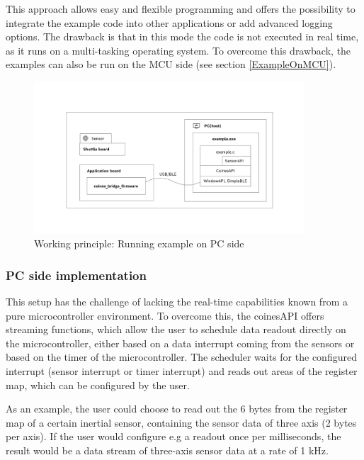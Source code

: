\documentclass{article}
\begin{document}
This approach allows easy and flexible programming and offers the possibility to integrate the example code into other applications or add advanced logging options. The drawback is that in this mode the code is not executed in real time, as it runs on a multi-tasking operating system. To overcome this drawback, the examples can also be run on the MCU side (see section \ref{ExampleOnMCU}).

\begin{figure}[H]
	\begin{center}
		\includegraphics[width=0.9\textwidth]{coinesAPI_images/COINES_workingPrinciple_runOnPC.png}
		\caption{Working principle: Running example on PC side}
	\end{center}
\end{figure}

\subsubsection{PC side implementation}
This setup has the challenge of lacking the real-time capabilities known from a pure microcontroller environment. To overcome this, the coinesAPI offers streaming functions, which allow the user to schedule data readout directly on the microcontroller, either based on a data interrupt coming from the sensors or based on the timer of the microcontroller. The scheduler waits for the configured interrupt (sensor interrupt or timer interrupt) and reads out areas of the register map, which can be configured by the user.

As an example, the user could choose to read out the 6 bytes from the register map of a certain inertial sensor, containing the sensor data of three axis (2 bytes per axis). If the user would configure e.g a readout once per milliseconds, the result would be a data stream of three-axis sensor data at a rate of 1 kHz.
\end{document}
